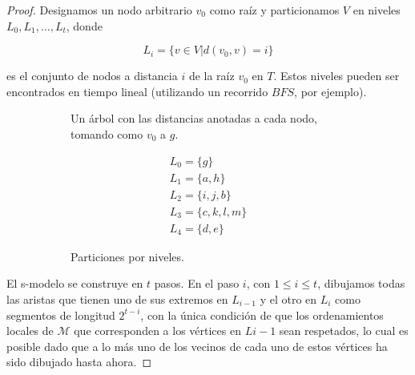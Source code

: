 \begin{proof}
  Designamos un nodo arbitrario $v_0$ como raíz y particionamos $V$ en niveles $L_0, L_1, \dots, L_t$, donde

  \begin{equation*}
    L_i = \{v\in V | d(v_0,v) = i\}
  \end{equation*}

  es el conjunto de nodos a distancia $i$ de la raíz $v_0$ en $T$. Estos niveles pueden ser encontrados en tiempo lineal (utilizando un recorrido $BFS$, por ejemplo).

\begin{figure}
    \begin{subfigure}{0.4\textwidth}
      \caption{Un árbol con las distancias anotadas a cada nodo, tomando como $v_0$ a $g$.}
    \end{subfigure}
    \begin{subfigure}{0.4\textwidth}
        \begin{equation*}
          \begin{split}
            L_0 = \{g\} \\
            L_1 = \{a, h\} \\
            L_2 = \{i, j, b\} \\
            L_3 = \{c, k, l, m\} \\
            L_4 = \{d, e\}
          \end{split}
        \end{equation*}
        \caption{Particiones por niveles.}
    \end{subfigure}
    \caption{}
\end{figure}

  El s-modelo se construye en $t$ pasos. En el paso $i$, con $1 \leq i \leq t$, dibujamos todas las aristas que tienen uno de sus extremos en $L_{i-1}$ y el otro en $L_i$ como segmentos de longitud $2^{t-i}$, con la única condición de que los ordenamientos locales de $\mathcal{M}$ que corresponden a los vértices en $L{i-1}$ sean respetados, lo cual es posible dado que a lo más uno de los vecinos de cada uno de estos vértices ha sido dibujado hasta ahora.
\end{proof}
